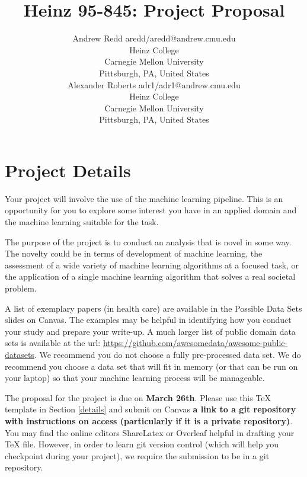 \documentclass[twoside,11pt]{article}
\begin{document}
\title{Heinz 95-845: Project Proposal}

\author{\name Andrew Redd \email aredd/aredd@andrew.cmu.edu \\
       \addr Heinz College\\
       Carnegie Mellon University\\
       Pittsburgh, PA, United States \\
       \AND
       \name Alexander Roberts \email adr1/adr1@andrew.cmu.edu \\
       \addr Heinz College\\
       Carnegie Mellon University\\
       Pittsburgh, PA, United States}
\maketitle


\section{Project Details}
Your project will involve the use of the machine learning pipeline. This is an opportunity for you to explore some interest you have in an applied domain and the machine learning suitable for the task.

The purpose of the project is to conduct an analysis that is novel in some way. The novelty could be in terms of development of machine learning, the assessment of a wide variety of machine learning algorithms at a focused task, or the application of a single machine learning algorithm that solves a real societal problem.

A list of exemplary papers (in health care) are available in the Possible Data Sets slides on Canvas. The examples may be helpful in identifying how you conduct your study and prepare your write-up. A much larger list of public domain data sets is available at the url: \url{https://github.com/awesomedata/awesome-public-datasets}. We recommend you do not choose a fully pre-processed data set. We do recommend you choose a data set that will fit in memory (or that can be run on your laptop) so that your machine learning process will be manageable.

The proposal for the project is due on \textbf{March 26th}. Please use this TeX template in Section \ref{details} and submit on Canvas \textbf{a link to a git repository with instructions on access (particularly if it is a private repository)}. You may find the online editors ShareLatex or Overleaf helpful in drafting your TeX file. However, in order to learn git version control (which will help you checkpoint during your project), we require the submission to be in a git repository.
\end{document}

